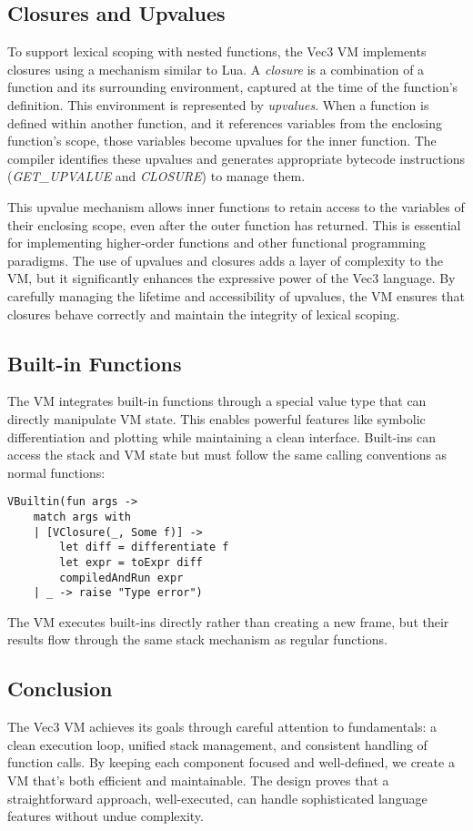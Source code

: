 \subsection{Closures and Upvalues}\label{subsec:closures-and-upvalues}
To support lexical scoping with nested functions, the Vec3 VM implements closures using a mechanism similar to Lua\citet{lua}.
A \textit{closure} is a combination of a function and its surrounding environment, captured at the time of the function's definition.
This environment is represented by \textit{upvalues}.
When a function is defined within another function, and it references variables from the enclosing function's scope, those variables become upvalues for the inner function.
 The compiler identifies these upvalues and generates appropriate bytecode instructions (\textit{GET\_UPVALUE} and \textit{CLOSURE}) to manage them.

This upvalue mechanism allows inner functions to retain access to the variables of their enclosing scope, even after the outer function has returned.
This is essential for implementing higher-order functions and other functional programming paradigms.
The use of upvalues and closures adds a layer of complexity to the VM, but it significantly enhances the expressive power of the Vec3 language.
By carefully managing the lifetime and accessibility of upvalues, the VM ensures that closures behave correctly and maintain the integrity of lexical scoping.

\subsection{Built-in Functions}\label{subsec:built-in-functions}
The VM integrates built-in functions through a special value type that can directly manipulate VM state.
This enables powerful features like symbolic differentiation and plotting while maintaining a clean interface.
Built-ins can access the stack and VM state but must follow the same calling conventions as normal functions:

\begin{verbatim}
VBuiltin(fun args ->
    match args with
    | [VClosure(_, Some f)] ->
        let diff = differentiate f
        let expr = toExpr diff
        compiledAndRun expr
    | _ -> raise "Type error")
\end{verbatim}

The VM executes built-ins directly rather than creating a new frame, but their results flow through the same stack mechanism as regular functions.

\subsection{Conclusion}\label{subsec:conclusion}
The Vec3 VM achieves its goals through careful attention to fundamentals: a clean execution loop, unified stack management, and consistent handling of function calls.
By keeping each component focused and well-defined, we create a VM that's both efficient and maintainable.
The design proves that a straightforward approach, well-executed, can handle sophisticated language features without undue complexity.
